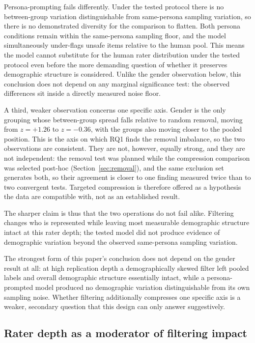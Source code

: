 \documentclass[11pt,a4paper]{article}
\begin{document}
Persona-prompting fails differently. Under the tested protocol there is no between-group
variation distinguishable from same-persona sampling variation, so there is no demonstrated
diversity for the comparison to flatten. Both persona conditions remain
within the same-persona sampling floor, and the model simultaneously under-flags unsafe items
relative to the human pool. This means the model cannot substitute for the human rater
distribution under the tested protocol even before the more demanding question of whether it
preserves demographic structure is considered. Unlike the gender observation below, this
conclusion does not depend on any marginal significance test: the observed differences sit inside
a directly measured noise floor.

A third, weaker observation concerns one specific axis. Gender is the only grouping whose
between-group spread falls relative to random removal, moving from $z = +1.26$ to $z = -0.36$,
with the groups also moving closer to the pooled position. This is the axis on which RQ1 finds the
removal imbalance, so the two observations are consistent. They are not, however, equally strong, and
they are not independent: the removal test was planned while the compression comparison was
selected post-hoc (Section~\ref{sec:removal}), and the same exclusion set generates both, so
their agreement is closer to one finding measured twice than to two convergent tests. Targeted
compression is therefore offered as a hypothesis the data are compatible with, not as an
established result.

The sharper claim is thus that the two operations do not fail alike. Filtering changes who is
represented while leaving most measurable demographic structure intact at this rater depth; the
tested model did not produce evidence of demographic variation beyond the observed
same-persona sampling variation.

The strongest form of this paper's conclusion does not depend on the gender result at all: at
high replication depth a demographically skewed filter left pooled labels and overall demographic
structure essentially intact, while a persona-prompted model produced no demographic
variation distinguishable from its own sampling noise. Whether filtering additionally compresses one specific axis is a weaker,
secondary question that this design can only answer suggestively.

\subsection{Rater depth as a moderator of filtering impact}
\end{document}
